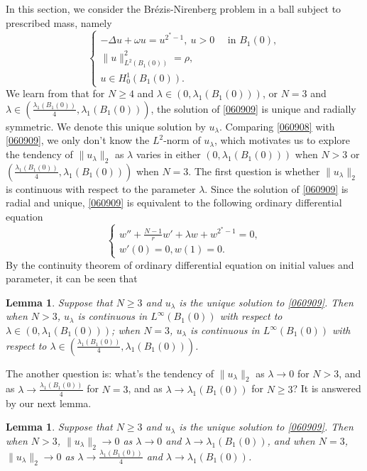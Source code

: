 \documentclass[10pt]{article}
\numberwithin{equation}{section}
\newtheorem{lemma}[theorem]{Lemma}
\numberwithin{equation}{section}
\begin{document}
In this section, we consider the Br\'{e}zis-Nirenberg problem in a ball subject to prescribed mass, namely
\begin{equation}\label{060908}
\begin{cases}
-\Delta u+\omega u=u^{2^{*}-1},~ u>0 \quad\text { in } B_1(0), \\
\|u\|^2_{L^2(B_1(0))}=\rho,\\
u\in H^1_0(B_1(0)).
\end{cases}
\end{equation}
 We learn from \cite{Zhang92} that for $N\ge 4$ and $\lambda\in \left(0, \lambda_1(B_1(0))\right)$, or $N=3$ and $\lambda\in \left(\frac{\lambda_1(B_1(0))}{4},\lambda_1(B_1(0))\right)$, the solution of \eqref{060909} is unique and radially symmetric. We denote this unique solution by $u_\lambda$. Comparing \eqref{060908} with \eqref{060909}, we only don't know the $L^2$-norm of $u_\lambda$, which motivates us to explore the tendency of $\|u_\lambda\|_2$ as $\lambda$ varies in either $(0,\lambda_1(B_1(0)))$ when $N>3$ or $\left(\frac{\lambda_1(B_1(0))}{4},\lambda_1(B_1(0))\right)$ when $N=3$. The first question is whether $\|u_\lambda\|_2$ is continuous with respect to the parameter $\lambda$. Since the solution of \eqref{060909} is radial and unique, \eqref{060909} is equivalent to the following ordinary differential equation 
 \begin{equation*}
\begin{cases}
w''+\frac{N-1}{r}w'+\lambda w+w^{2^{*}-1}=0,\\
w'(0)=0, w(1)=0.
\end{cases}
\end{equation*}
 By the continuity theorem of ordinary differential equation on initial values and parameter, it can be seen that
\begin{lemma}\label{060920}
Suppose that $N\ge 3$ and $u_\lambda$ is the unique solution to \eqref{060909}. Then when $N>3$, $u_\lambda$ is continuous in $L^{\infty}(B_1(0))$ with respect to  $\lambda\in (0,\lambda_1(B_1(0)))$; when $N=3$, $u_\lambda$ is continuous in $L^{\infty}(B_1(0))$ with respect to  $\lambda\in \left(\frac{\lambda_1(B_1(0))}{4},\lambda_1(B_1(0))\right)$.
\end{lemma}
The another question is: what's the tendency of $\|u_\lambda\|_2$ as $\lambda\to 0$  for $N>3$, and as $\lambda\to\frac{\lambda_1(B_1(0))}{4}$ for $N=3$, and as $\lambda\to \lambda_1(B_1(0))$ for $N\ge 3$? It is answered by our next lemma.
\begin{lemma}\label{060921}
Suppose that $N\ge 3$ and $u_\lambda$ is the unique solution to \eqref{060909}. Then when $N>3$, $\|u_\lambda\|_2\to 0$ as $\lambda\to 0$ and $\lambda\to \lambda_1(B_1(0))$, and when $N=3$, $\|u_\lambda\|_2\to 0$ as $\lambda\to {\frac{ \lambda_1(B_1(0))}{4}}$ and $\lambda\to \lambda_1(B_1(0))$.
\end{lemma}
\end{document}
